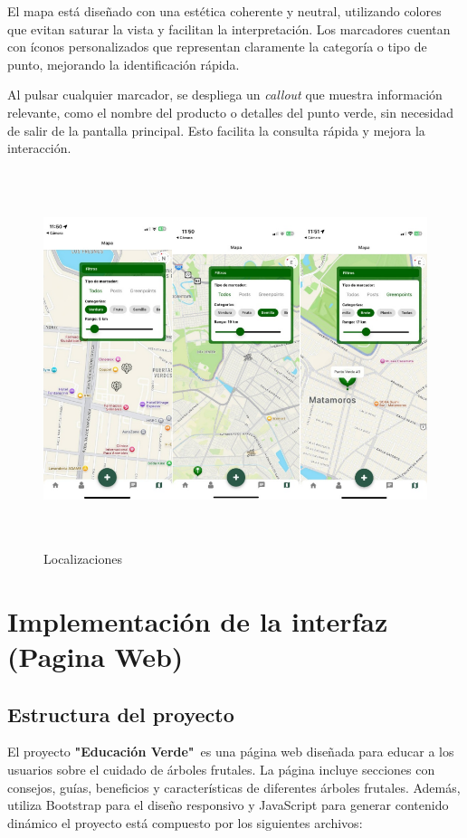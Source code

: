 \documentclass[11pt, a4paper, oneside]{book}
\begin{document}
El mapa está diseñado con una estética coherente y neutral, utilizando colores que evitan saturar la vista y facilitan la interpretación. Los marcadores cuentan con íconos personalizados que representan claramente la categoría o tipo de punto, mejorando la identificación rápida.

Al pulsar cualquier marcador, se despliega un \textit{callout} que muestra información relevante, como el nombre del producto o detalles del punto verde, sin necesidad de salir de la pantalla principal. Esto facilita la consulta rápida y mejora la interacción.



\begin{figure}[H]
    \centering
    \includegraphics[width=15cm, height=11cm]{Pictures/mapa.png}
    \caption{Localizaciones}
\end{figure}


  
\vspace{3cm}



\chapter{Implementación de la interfaz (Pagina Web) }
\noindent
\section{Estructura del proyecto}
El proyecto \textbf{\textbf{"Educación Verde"}} es una página web diseñada para educar a los usuarios sobre el cuidado de árboles frutales. La página incluye secciones con consejos, guías, beneficios y características de diferentes árboles frutales. Además, utiliza Bootstrap para el diseño responsivo y JavaScript para generar contenido dinámico el proyecto está compuesto por los siguientes archivos:
\end{document}
